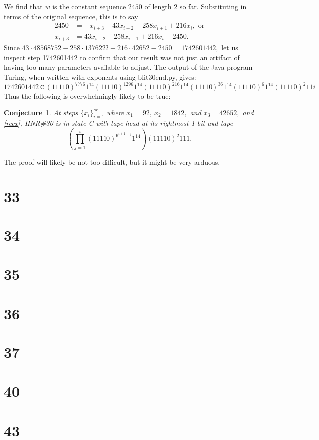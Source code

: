 \documentclass[12pt]{article}
\newtheorem*{conjecture}{Conjecture}
\begin{document}
We find that $w$ is the constant sequence $2450$ of length 2 so far.
Substituting in terms of the original sequence, this is to say
\begin{align}
2450&=-x_{i+3}+43x_{i+2}-258x_{i+1}+216x_i,\textrm{ or}\\
x_{i+3}&=43x_{i+2}-258x_{i+1}+216x_i-2450.\label{recx}
\end{align}
Since $43\cdot48568752-258\cdot1376222+216\cdot42652-2450=1742601442,$
let us inspect step 1742601442 to confirm that our result was not just an artifact of having
too many parameters available to adjust. The output of the Java program Turing,
when written with exponents using blit30end.py, gives:
$$1742601442~\texttt{C}~(11110)^{7776}1^{14}(11110)^{1296}1^{14}(11110)^{216}1^{14}(11110)^{36}1^{14}(11110)^{6}1^{14}(11110)^{2}11i$$
Thus the following is overwhelmingly likely to be true:
\begin{conjecture}
At steps $\{x_i\}_{i=1}^{\infty}$ where $x_1=92,~x_2=1842,$ and $x_3=42652,$ and \eqref{recx},
HNR\#30 is in state C with tape head at its rightmost 1 bit and tape
$$\left(\prod_{j=1}^i (11110)^{6^{i+1-j}}1^{14}\right)(11110)^2 111.$$
\end{conjecture}
The proof will likely be not too difficult, but it might be very arduous.
\clearpage
{}
{}
\section*{33}

\clearpage
{}
{}
\section*{34}

\clearpage
{}
{}
\section*{35}

\clearpage
{}
{}
\section*{36}

\clearpage
{}
{}
\section*{37}

\clearpage
{}
{}
\section*{40}

\clearpage
{}
{}
\section*{43}
\end{document}
